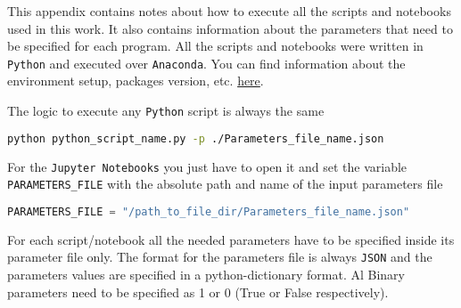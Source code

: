 This appendix contains notes about how to execute all the scripts and notebooks used in this work. It also contains information about the parameters that need to be specified for each program.
All the scripts and notebooks were written in \texttt{Python} and executed over \texttt{Anaconda}. You can find information about the environment setup, packages version, etc. \href{https://github.com/andresbecker/master_thesis}{here}.

The logic to execute any \texttt{Python} script is always the same
\begin{lstlisting}[language=Bash]
python python_script_name.py -p ./Parameters_file_name.json
\end{lstlisting}

For the \texttt{Jupyter Notebooks} you just have to open it and set the variable \\
\noindent\texttt{PARAMETERS\_FILE} with the absolute path and name of the input parameters file
\begin{lstlisting}[language=Python]
PARAMETERS_FILE = "/path_to_file_dir/Parameters_file_name.json"
\end{lstlisting}

For each script/notebook all the needed parameters have to be specified inside its parameter file only. The format for the parameters file is always \texttt{JSON} and the parameters values are specified in a python-dictionary format. Al Binary parameters need to be specified as 1 or 0 (True or False respectively).
